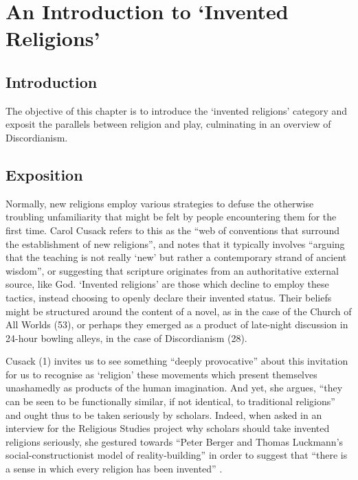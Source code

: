\documentclass[Draft.tex]{subfiles}
\begin{document}
\chapter{An Introduction to `Invented Religions'}

\section*{Introduction}
The objective of this chapter is to introduce
the `invented religions' category
and exposit the parallels between religion and play,
culminating in an overview of Discordianism.

\section*{Exposition}
Normally, new religions employ various strategies
to defuse the otherwise troubling unfamiliarity
that might be felt by people encountering them for the first time.
Carol Cusack \parencite*[1]{Cusack10} refers to this as the
``web of conventions that surround the establishment of new religions'',
and notes that it typically involves
``arguing that the teaching is not really `new' but rather
a contemporary strand of ancient wisdom'',
or suggesting that scripture originates from
an authoritative external source, like God.
`Invented religions' are those which decline to employ these tactics,
instead choosing to openly declare their invented status.
Their beliefs might be structured around the content of a novel,
as in the case of the Church of All Worlds (53),
or perhaps they emerged as a product of late-night discussion in
24-hour bowling alleys, in the case of Discordianism (28).

Cusack (1) invites us to see something ``deeply provocative''
about this invitation for us to recognise as `religion'
these movements which present themselves unashamedly as
products of the human imagination.
And yet, she argues, ``they can be seen to be functionally similar,
if not identical, to traditional religions''
and ought thus to be taken seriously by scholars.
Indeed, when asked in an interview for the Religious Studies project
why scholars should take invented religions seriously,
she  gestured towards ``Peter Berger and Thomas Luckmann’s
social-constructionist model of reality-building'' in order to suggest
that ``there is a sense in which every religion has been invented''
\parencite*{CusackPodcast}.
\end{document}
